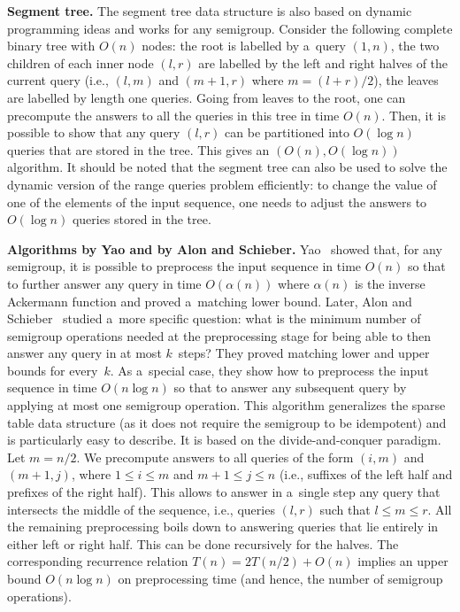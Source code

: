 
\textbf{Segment tree.} The segment tree data structure is also based on dynamic
programming ideas and works for any semigroup. Consider the following complete
binary tree with $O(n)$ nodes: the root is labelled by a~query $(1,n)$, the two
children of each inner node $(l,r)$ are labelled by the left and right halves of
the current query (i.e., $(l,m)$ and $(m+1,r)$ where $m=(l+r)/2$), the leaves
are labelled by length one queries. Going from leaves to the root, one can
precompute the answers to all the queries in this tree in time $O(n)$. Then, it
is possible to show that any query $(l,r)$ can be  partitioned into $O(\log n)$
queries that are stored in the tree. This gives an $(O(n), O(\log n))$
algorithm. It should be noted that the segment tree can also be used to solve
the dynamic version of the range queries problem efficiently: to change the
value of one of the elements of the input sequence, one needs to adjust the
answers to $O(\log n)$ queries stored in the tree.

\textbf{Algorithms by Yao and by Alon and Schieber.}
Yao~\cite{DBLP:conf/stoc/Yao82} showed that, for any semigroup, it is possible
to preprocess the input sequence in time $O(n)$ so that to further answer any
query in time $O(\alpha(n))$ where $\alpha(n)$ is the inverse Ackermann function
and proved a~matching lower bound. Later, Alon and
Schieber~\cite{Alon87optimalpreprocessing} studied a~more specific question:
what is the minimum number of semigroup operations needed at the preprocessing
stage for being able to then answer any query in at most $k$~steps? They proved
matching lower and upper bounds for every~$k$. As a~special case, they show how
to preprocess the input sequence in time $O(n\log n)$ so that to answer any
subsequent query by applying at most one semigroup operation. This algorithm
generalizes the sparse table data structure (as it does not require the
semigroup to be idempotent) and is particularly easy to describe. It is based on
the divide-and-conquer paradigm. Let $m=n/2$. We precompute answers to all
queries of the form $(i,m)$ and $(m+1,j)$, where $1 \le i \le m$ and
$m+1 \le j \le n$ (i.e., suffixes of the left half and prefixes of the right
half). This allows to answer in a~single step any query that intersects the
middle of the sequence, i.e., queries $(l,r)$ such that $l \le m \le r$. All the
remaining preprocessing boils down to answering queries that lie entirely in
either left or right half. This can be done recursively for the halves. The
corresponding recurrence relation $T(n)=2T(n/2)+O(n)$ implies an upper bound
$O(n\log n)$ on preprocessing time (and hence, the number of semigroup
operations).

